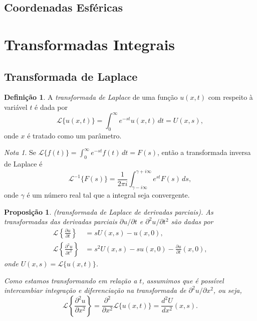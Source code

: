\documentclass{article}
\theoremstyle{plain}
\newtheorem{prop}[thm]{Proposição}
\theoremstyle{definition}
\newtheorem{defn}{Definição}[section]
\theoremstyle{remark}
\newtheorem*{rem}{Nota}
\begin{document}
\subsection{Coordenadas Esféricas}

\section{Transformadas Integrais}

\subsection{Transformada de Laplace}

\begin{defn}
    A \emph{transformada de Laplace} de uma função \(u(x,t)\) com respeito à variável \(t\) é dada por
    \begin{equation}
        \mathcal{L}\{u(x,t)\} = \int_{0}^{\infty} e^{-st} u(x,t) \, dt = U(x,s),
    \end{equation}
    \noindent onde \(x\) é tratado como um parâmetro.
\end{defn}

\begin{rem}
    Se \(\mathcal{L}\{f(t)\} = \int_{0}^{\infty} e^{-st} f(t) \, dt = F(s)\), então a transformada inversa de Laplace é
    \begin{equation}
        \mathcal{L}^{-1}\{F(s)\} = \frac{1}{2\pi i} \int_{\gamma-i\infty}^{\gamma+i\infty} e^{st} F(s) \, ds,
    \end{equation}
    \noindent onde \(\gamma\) é um número real tal que a integral seja convergente.
\end{rem}

\begin{prop} (transformada de Laplace de derivadas parciais).
    As transformadas das derivadas parciais \(\partial u/\partial t\) e \(\partial^2 u/\partial t^2\) são dadas por
    \begin{align}
        \mathcal{L}\left\{\frac{\partial u}{\partial t}\right\} &= s U(x,s) - u(x,0), \label{eq:laplace-derivada-primeira} \\
        \mathcal{L}\left\{\frac{\partial^2 u}{\partial t^2}\right\} &= s^2 U(x,s) - s u(x,0) - \frac{\partial u}{\partial t}(x,0), \label{eq:laplace-derivada-segunda}
    \end{align}
    \noindent onde \(U(x,s) = \mathcal{L}\{u(x,t)\}\).

    Como estamos transformando em relação a \(t\), assumimos que é possível intercambiar integração e diferenciação na transformada de \(\partial^2u/\partial x^2\), ou seja,
    \begin{equation}
        \mathcal{L}\left\{\frac{\partial^2 u}{\partial x^2}\right\} = \frac{\partial^2}{\partial x^2} \mathcal{L}\{u(x,t)\} = \frac{d^2 U}{d x^2}(x,s).
    \end{equation}
\end{prop}
\end{document}
